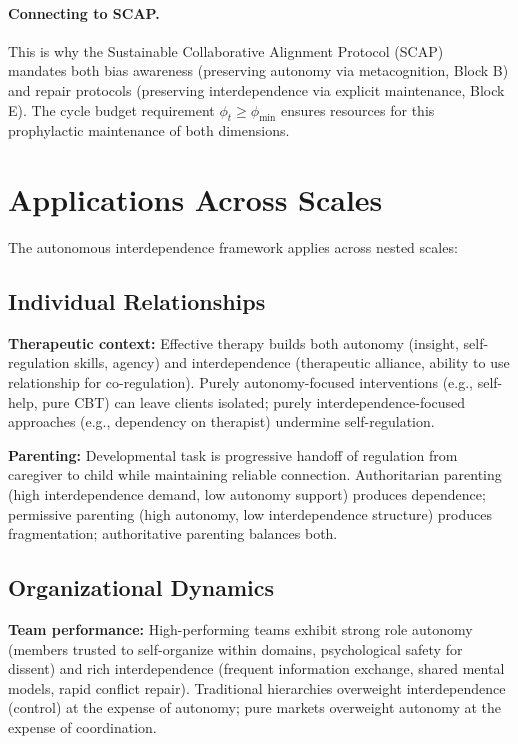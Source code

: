 \documentclass[11pt,a4paper]{article}
\begin{document}
\paragraph{Connecting to SCAP.} This is why the Sustainable Collaborative Alignment Protocol (SCAP)~\cite{scap} mandates both bias awareness (preserving autonomy via metacognition, Block B) and repair protocols (preserving interdependence via explicit maintenance, Block E). The cycle budget requirement $\phi_t \geq \phi_{\min}$ ensures resources for this prophylactic maintenance of both dimensions.

\section{Applications Across Scales}

The autonomous interdependence framework applies across nested scales:

\subsection{Individual Relationships}

\textbf{Therapeutic context:} Effective therapy builds both autonomy (insight, self-regulation skills, agency) and interdependence (therapeutic alliance, ability to use relationship for co-regulation). Purely autonomy-focused interventions (e.g., self-help, pure CBT) can leave clients isolated; purely interdependence-focused approaches (e.g., dependency on therapist) undermine self-regulation.

\textbf{Parenting:} Developmental task is progressive handoff of regulation from caregiver to child while maintaining reliable connection. Authoritarian parenting (high interdependence demand, low autonomy support) produces dependence; permissive parenting (high autonomy, low interdependence structure) produces fragmentation; authoritative parenting balances both.

\subsection{Organizational Dynamics}

\textbf{Team performance:} High-performing teams exhibit strong role autonomy (members trusted to self-organize within domains, psychological safety for dissent) and rich interdependence (frequent information exchange, shared mental models, rapid conflict repair). Traditional hierarchies overweight interdependence (control) at the expense of autonomy; pure markets overweight autonomy at the expense of coordination.
\end{document}
